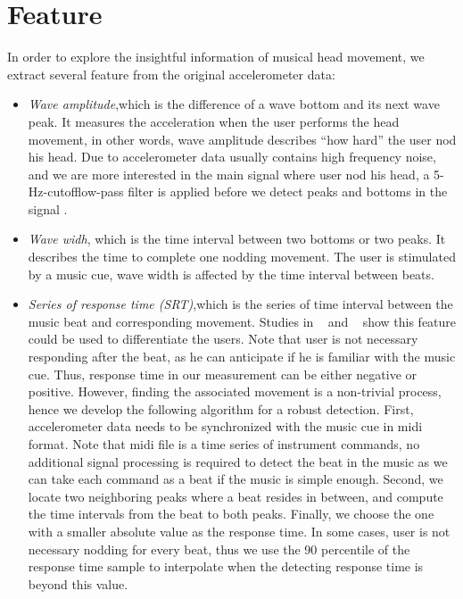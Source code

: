 \section{Feature}
In order to explore the insightful  information of musical head movement, we extract several feature from the original accelerometer data:
\begin{itemize}
\item{\em Wave amplitude},which is the difference of a wave bottom and its next wave peak. It measures the acceleration when the user performs the head movement, in other words, wave amplitude describes “how hard” the user nod his head. Due to accelerometer data usually contains high frequency noise, and we are more interested in the main signal where user nod his head, a 5-Hz-cutofflow-pass filter is applied before we detect peaks and bottoms in the signal .   
\item{\em Wave widh}, which is the time interval between two bottoms or two peaks. It describes the time to complete one nodding movement. The user is stimulated by a music cue, wave width is affected by the time interval between beats.
\item{\em Series of response time (SRT)},which is the series of time interval between the music beat and corresponding movement. Studies in ~\cite{eye blink} and ~\cite{tap beat} show this feature could be used to differentiate the users. Note that user is not necessary responding after the beat, as he can anticipate if he is familiar with the music cue. Thus, response time in our measurement can be either negative or positive. However, finding the associated movement is a non-trivial process, hence we develop the following algorithm for a robust detection. First, accelerometer data needs to be synchronized with the music cue in midi format. Note that midi file is a time series of instrument commands,  no additional signal processing is required to detect the beat in the music as we can take each command as a beat if the music is simple enough. Second, we locate two neighboring peaks where a beat resides in between, and compute the time intervals from the beat to both peaks. Finally, we choose the one with a smaller absolute value as the response time. In some cases,  user is not necessary nodding for every beat,  thus we use the 90 percentile of the response time sample to interpolate  when the detecting response time is beyond this value. 
\end{itemize}
